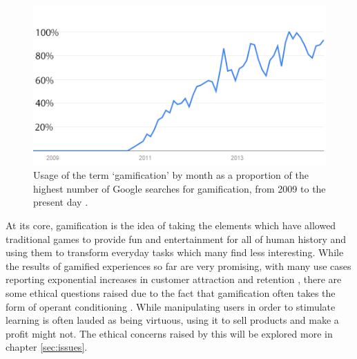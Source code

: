 \documentclass[12pt,a4paper,twoside]{report}
\begin{document}
\begin{figure}
\begin{center}
	\includegraphics{../img/usage-graph.png}
	\caption{Usage of the term `gamification' by month as a proportion of the highest number of Google searches for gamification, from 2009 to the present day \cite{usage}.}
	\label{usagegraph}
\end{center}
\end{figure}

At its core, gamification is the idea of taking the elements which have allowed traditional games to provide fun and entertainment for all of human history and using them to transform everyday tasks which many find less interesting. While the results of gamified experiences so far are very promising, with many use cases reporting exponential increases in customer attraction and retention \cite{zichermann2010game}, there are some ethical questions raised due to the fact that gamification often takes the form of operant conditioning \cite{kapp2012gamification}. While manipulating users in order to stimulate learning is often lauded as being virtuous, using it to sell products and make a profit might not. The ethical concerns raised by this will be explored more in chapter \ref{sec:issues}.
\end{document}
